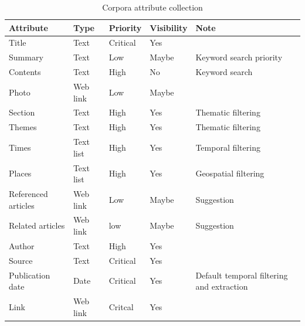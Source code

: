 \begin{table} [H]
		\centering
		\begin{tabular}{| l l l l p{5cm} |}
			\hline
			\textbf{Attribute} & \textbf{Type} & \textbf{Priority} & \textbf{Visibility} & \textbf{Note} \\
			\hline
			Title & Text & Critical & Yes & \\
			Summary & Text & Low & Maybe & Keyword search priority \\
			Contents & Text & High & No & Keyword search \\
			Photo & Web link & Low & Maybe & \\
			Section & Text & High & Yes & Thematic filtering \\
			Themes & Text & High & Yes & Thematic filtering \\
			Times & Text list & High & Yes & Temporal filtering \\
			Places & Text list & High & Yes & Geospatial filtering \\
			Referenced articles & Web link & Low & Maybe &Suggestion \\
			Related articles & Web link & low & Maybe &Suggestion \\
			Author & Text & High & Yes & \\
			Source & Text & Critical & Yes & \\
			Publication date & Date & Critical & Yes & Default temporal filtering and extraction\\
			Link & Web link & Critcal & Yes & \\
			\hline
		\end{tabular}
		\caption{Corpora attribute collection}
		\label{table:data_corpora}
\end{table}

